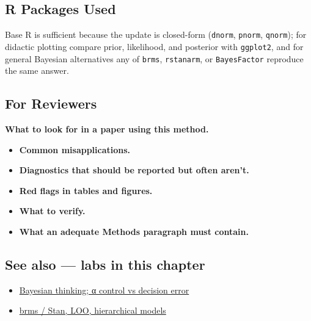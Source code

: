 \documentclass[
]{article}
\providecommand{\tightlist}{%
  \setlength{\itemsep}{0pt}\setlength{\parskip}{0pt}}
\begin{document}
\subsection{R Packages Used}\label{r-packages-used}

Base R is sufficient because the update is closed-form (\texttt{dnorm},
\texttt{pnorm}, \texttt{qnorm}); for didactic plotting compare prior,
likelihood, and posterior with \texttt{ggplot2}, and for general
Bayesian alternatives any of \texttt{brms}, \texttt{rstanarm}, or
\texttt{BayesFactor} reproduce the same answer.

\subsection{For Reviewers}\label{for-reviewers}

\textbf{What to look for in a paper using this method.}

\begin{itemize}
\tightlist
\item
  \textbf{Common misapplications.}
\item
  \textbf{Diagnostics that should be reported but often aren't.}
\item
  \textbf{Red flags in tables and figures.}
\item
  \textbf{What to verify.}
\item
  \textbf{What an adequate Methods paragraph must contain.}
\end{itemize}

\subsection{See also --- labs in this
chapter}\label{see-also-labs-in-this-chapter}

\begin{itemize}
\tightlist
\item
  \href{labs/lab-bayesian-thinking-control-vs-decision-error.Rmd}{Bayesian
  thinking; α control vs decision error}
\item
  \href{labs/lab-brms-stan-loo-hierarchical-models.Rmd}{brms / Stan,
  LOO, hierarchical models}
\end{itemize}
\end{document}
